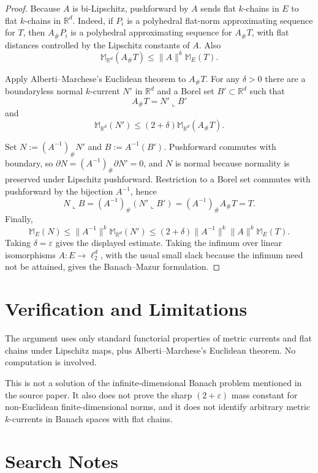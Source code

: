 \documentclass[11pt]{amsart}
\newcommand{\Mass}{\mathbb M}
\newcommand{\R}{\mathbb R}
\begin{document}
\begin{proof}
Because \(A\) is bi-Lipschitz, pushforward by \(A\) sends flat \(k\)-chains in
\(E\) to flat \(k\)-chains in \(\R^d\). Indeed, if \(P_i\) is a polyhedral
flat-norm approximating sequence for \(T\), then \(A_\#P_i\) is a polyhedral
approximating sequence for \(A_\#T\), with flat distances controlled by the
Lipschitz constants of \(A\). Also
\[
  \Mass_{\R^d}(A_\#T)\le \|A\|^k \Mass_E(T).
\]

Apply Alberti--Marchese's Euclidean theorem to \(A_\#T\). For any
\(\delta>0\) there are a boundaryless normal \(k\)-current \(N'\) in
\(\R^d\) and a Borel set \(B'\subset\R^d\) such that
\[
  A_\#T=N'\llcorner B'
\]
and
\[
  \Mass_{\R^d}(N')\le (2+\delta)\Mass_{\R^d}(A_\#T).
\]

Set \(N:=(A^{-1})_\#N'\) and \(B:=A^{-1}(B')\). Pushforward commutes with
boundary, so \(\partial N=(A^{-1})_\#\partial N'=0\), and \(N\) is normal
because normality is preserved under Lipschitz pushforward. Restriction to a
Borel set commutes with pushforward by the bijection \(A^{-1}\), hence
\[
  N\llcorner B
  =(A^{-1})_\#(N'\llcorner B')
  =(A^{-1})_\#A_\#T
  =T.
\]
Finally,
\[
  \Mass_E(N)
  \le \|A^{-1}\|^k \Mass_{\R^d}(N')
  \le (2+\delta)\|A^{-1}\|^k\|A\|^k\Mass_E(T).
\]
Taking \(\delta=\varepsilon\) gives the displayed estimate. Taking the
infimum over linear isomorphisms \(A:E\to\ell_2^d\), with the usual small
slack because the infimum need not be attained, gives the Banach--Mazur
formulation.
\end{proof}

\section*{Verification and Limitations}

The argument uses only standard functorial properties of metric currents and
flat chains under Lipschitz maps, plus Alberti--Marchese's Euclidean theorem.
No computation is involved.

This is not a solution of the infinite-dimensional Banach problem mentioned in
the source paper. It also does not prove the sharp \((2+\varepsilon)\) mass
constant for non-Euclidean finite-dimensional norms, and it does not identify
arbitrary metric \(k\)-currents in Banach spaces with flat chains.

\section*{Search Notes}
\end{document}
